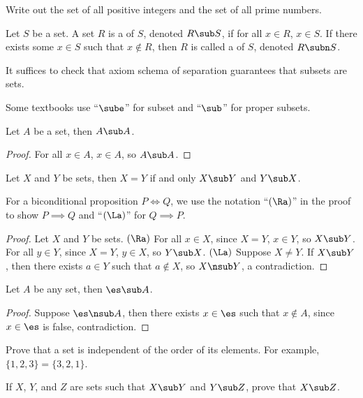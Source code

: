 \documentclass[10pt]{article}
\begin{document}
\begin{problem}
    Write out the set of all positive integers and the set of all prime numbers.
\end{problem}
\begin{definition}
    Let $S$ be a set. A set $R$ is a  of $S$, denoted $R\sub S$, if for all $x\in R$, $x\in S$. If there exists some $x\in S$ such that $x\notin R$, then $R$ is called a  of $S$, denoted $R\subn S$.
\end{definition}
\par
It suffices to check that axiom schema of separation guarantees that subsets are sets.
\begin{remark}
    Some textbooks use ``$\sube$'' for subset and ``$\sub$'' for proper subsets.
\end{remark}
\begin{proposition}
    Let $A$ be a set, then $A\sub A$.
\end{proposition}
\begin{proof}
    For all $x\in A$, $x\in A$, so $A\sub A$. 
\end{proof}
\begin{proposition}
    Let $X$ and $Y$ be sets, then $X=Y$ if and only $X\sub Y$ and $Y\sub X$.
\end{proposition}
\begin{remark}
    For a biconditional proposition $P\iff Q$, we use the notation ``$(\Ra)$'' in the proof to show $P\implies Q$ and ``$(\La)$'' for $Q\implies P$.
\end{remark}
\begin{proof}
    Let $X$ and $Y$ be sets. $(\Ra)$ For all $x\in X$, since $X=Y$, $x\in Y$, so $X\sub Y$. For all $y\in Y$, since $X=Y$, $y\in X$, so $Y\sub X$. $(\La)$ Suppose $X\ne Y$. If $X\sub Y$, then there exists $a\in Y$ such that $a\notin X$, so $X\nsub Y$, a contradiction.
\end{proof}
\begin{proposition}
    Let $A$ be any set, then $\es\sub A$.
\end{proposition}
\begin{proof}
    Suppose $\es\nsub A$, then there exists $x\in\es$ such that $x\notin A$, since $x\in\es$ is false, contradiction.
\end{proof}
\begin{problem}
    Prove that a set is independent of the order of its elements. For example, $\{1,2,3\}=\{3,2,1\}$.
\end{problem}
\begin{problem}
    If $X$, $Y$, and $Z$ are sets such that $X\sub Y$ and $Y\sub Z$, prove that $X\sub Z$.
\end{problem}
\end{document}
